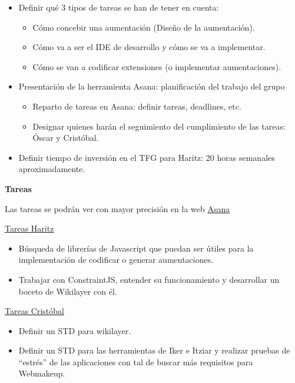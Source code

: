 \begin{itemize}
\itemsep1pt\parskip0pt
\item
  Definir qué 3 tipos de tareas se han de tener en cuenta:

  \begin{itemize}
  \itemsep1pt\parskip0pt
  \item
    Cómo concebir una aumentación (Diseño de la aumentación).
  \item
    Cómo va a ser el IDE de desarrollo y cómo se va a implementar.
  \item
    Cómo se van a codificar extensiones (o implementar aumentaciones).
  \end{itemize}
\item
  Presentación de la herramienta Asana: planificación del trabajo del
  grupo

  \begin{itemize}
  \itemsep1pt\parskip0pt
  \item
    Reparto de tareas en Asana: definir tareas, deadlines, etc.
  \item
    Designar quienes harán el seguimiento del cumplimiento de las
    tareas: Óscar y Cristóbal.
  \end{itemize}
\item
  Definir tiempo de inversión en el TFG para Haritz: 20 horas semanales
  aproximadamente.
\end{itemize}

\textbf{Tareas}

Las tareas se podrán ver con mayor precisión en la web
\href{https://app.asana.com/0/8179240639112/8179240639112}{Asana}

\underline{Tareas Haritz}

\begin{itemize}
\itemsep1pt\parskip0pt
\item
  Búsqueda de librerías de Javascript que puedan ser útiles para la
  implementación de codificar o generar aumentaciones.
\item
  Trabajar con ConstraintJS, entender su funcionamiento y desarrollar un
  boceto de Wikilayer con él.
\end{itemize}

\underline{Tareas Cristóbal}

\begin{itemize}
\itemsep1pt\parskip0pt
\item
  Definir un STD para wikilayer.
\item
  Definir un STD para las herramientas de Iker e Itziar y realizar pruebas de ``estrés'' de las aplicaciones con tal de buscar más requisitos para Webmakeup.
\end{itemize}

